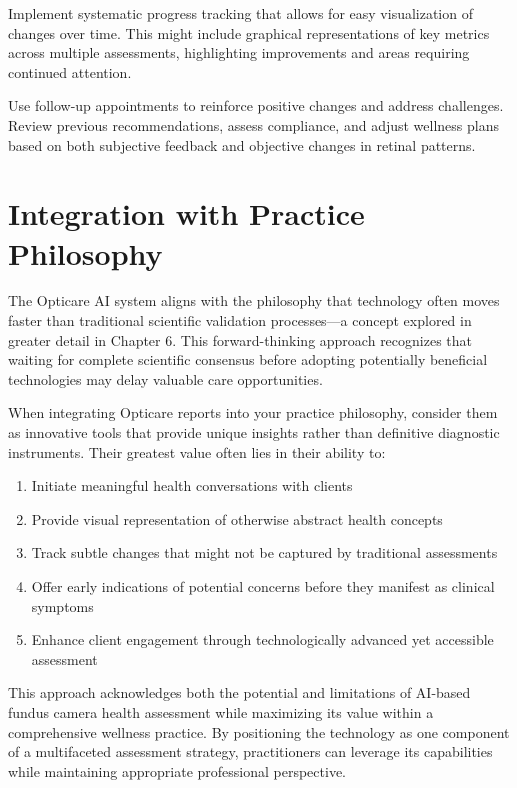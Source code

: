 \documentclass[
  Letterpaper,
]{scrbook}
\providecommand{\tightlist}{%
  \setlength{\itemsep}{0pt}\setlength{\parskip}{0pt}}\usepackage{longtable,booktabs,array}
\begin{document}
Implement systematic progress tracking that allows for easy
visualization of changes over time. This might include graphical
representations of key metrics across multiple assessments, highlighting
improvements and areas requiring continued attention.

Use follow-up appointments to reinforce positive changes and address
challenges. Review previous recommendations, assess compliance, and
adjust wellness plans based on both subjective feedback and objective
changes in retinal patterns.

\section{Integration with Practice
Philosophy}\label{integration-with-practice-philosophy}

The Opticare AI system aligns with the philosophy that technology often
moves faster than traditional scientific validation processes---a
concept explored in greater detail in Chapter 6. This forward-thinking
approach recognizes that waiting for complete scientific consensus
before adopting potentially beneficial technologies may delay valuable
care opportunities.

When integrating Opticare reports into your practice philosophy,
consider them as innovative tools that provide unique insights rather
than definitive diagnostic instruments. Their greatest value often lies
in their ability to:

\begin{enumerate}
\def\labelenumi{\arabic{enumi}.}
\tightlist
\item
  Initiate meaningful health conversations with clients
\item
  Provide visual representation of otherwise abstract health concepts
\item
  Track subtle changes that might not be captured by traditional
  assessments
\item
  Offer early indications of potential concerns before they manifest as
  clinical symptoms
\item
  Enhance client engagement through technologically advanced yet
  accessible assessment
\end{enumerate}

This approach acknowledges both the potential and limitations of
AI-based fundus camera health assessment while maximizing its value
within a comprehensive wellness practice. By positioning the technology
as one component of a multifaceted assessment strategy, practitioners
can leverage its capabilities while maintaining appropriate professional
perspective.
\end{document}
